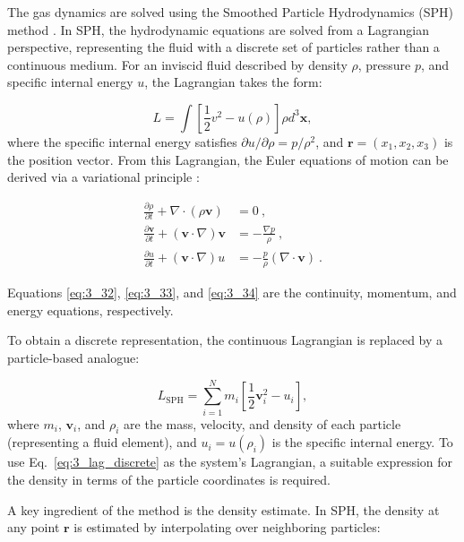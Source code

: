 The gas dynamics are solved using the Smoothed Particle Hydrodynamics (SPH) method \citep{gingold1977smoothed, lucy1977numerical}. In SPH, the hydrodynamic equations are solved from a Lagrangian perspective, representing the fluid with a discrete set of particles rather than a continuous medium. For an inviscid fluid described by density $\rho$, pressure $p$, and specific internal energy $u$, the Lagrangian takes the form:

\begin{equation}
	L = \int \left[ \frac{1}{2} v^2 - u(\rho) \right] \rho d^3\mathbf{x},
	\label{eq:3_Lag_clasic}
\end{equation}
where the specific internal energy satisfies $\partial u / \partial \rho = p/\rho^2$, and $\mathbf{r} = (x_1, x_2, x_3)$ is the position vector. From this Lagrangian, the Euler equations of motion can be derived via a variational principle \citep{rasio2000particle}:

\begin{align}
	\frac{\partial \rho}{\partial t} + \nabla \cdot (\rho \mathbf{v}) &= 0 \label{eq:3_32} ~,\\
	\frac{\partial \mathbf{v}}{\partial t} + (\mathbf{v} \cdot \nabla) \mathbf{v} &= -\frac{\nabla p}{\rho} \label{eq:3_33} ~,\\
	\frac{\partial u}{\partial t} + (\mathbf{v} \cdot \nabla) u &= -\frac{p}{\rho} (\nabla \cdot \mathbf{v}) \label{eq:3_34}~.
\end{align}

Equations \eqref{eq:3_32}, \eqref{eq:3_33}, and \eqref{eq:3_34} are the continuity, momentum, and energy equations, respectively. 

To obtain a discrete representation, the continuous Lagrangian is replaced by a particle-based analogue:

\begin{equation}
	L_{\mathrm{SPH}} = \sum_{i=1}^{N} m_i \left[ \frac{1}{2} \mathbf{v}_i^2 - u_i \right],
	\label{eq:3_lag_discrete}
\end{equation}
where $m_i$, $\mathbf{v}_i$, and $\rho_i$ are the mass, velocity, and density of each particle (representing a fluid element), and $u_i = u(\rho_i)$ is the specific internal energy. To use Eq.~\eqref{eq:3_lag_discrete} as the system's Lagrangian, a suitable expression for the density in terms of the particle coordinates is required.

A key ingredient of the method is the density estimate. In SPH, the density at any point $\mathbf{r}$ is estimated by interpolating over neighboring particles:

